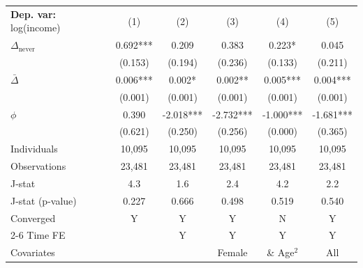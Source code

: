 \begin{tabular}{l ccccc} \toprule  \textbf{Dep. var:}  log(income) 
                    &\multicolumn{1}{c}{(1)}   &\multicolumn{1}{c}{(2)}   &\multicolumn{1}{c}{(3)}   &\multicolumn{1}{c}{(4)}   &\multicolumn{1}{c}{(5)}   \\

\addlinespace
$\Delta_{\text{never}}$&       0.692***&       0.209   &       0.383   &       0.223*  &       0.045   \\
                    &     (0.153)   &     (0.194)   &     (0.236)   &     (0.133)   &     (0.211)   \\

\addlinespace
$\bar{\Delta}$      &       0.006***&       0.002*  &       0.002** &       0.005***&       0.004***\\
                    &     (0.001)   &     (0.001)   &     (0.001)   &     (0.001)   &     (0.001)   \\

\addlinespace
$\phi$              &       0.390   &      -2.018***&      -2.732***&      -1.000***&      -1.681***\\
                    &     (0.621)   &     (0.250)   &     (0.256)   &     (0.000)   &     (0.365)   \\
\addlinespace
Individuals         &      10,095   &      10,095   &      10,095   &      10,095   &      10,095   \\
Observations        &      23,481   &      23,481   &      23,481   &      23,481   &      23,481   \\
J-stat              &         4.3   &         1.6   &         2.4   &         4.2   &         2.2   \\
J-stat (p-value)    &       0.227   &       0.666   &       0.498   &       0.519   &       0.540   \\
Converged           &           Y   &           Y   &           Y   &           N   &           Y   \\
\cmidrule{2-6} Time FE & & Y & Y & Y & Y \\ Covariates & & & Female & \& Age$^2$ & All \\ \bottomrule \end{tabular}
